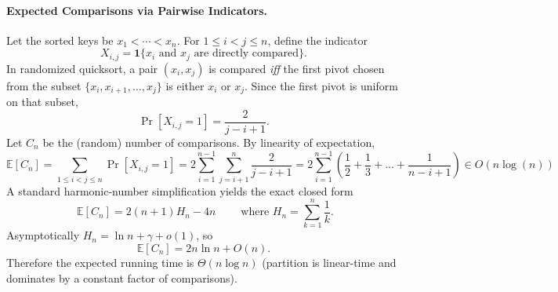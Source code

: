 \documentclass[9pt]{extarticle}
\begin{document}
\paragraph{Expected Comparisons via Pairwise Indicators.}
Let the sorted keys be $x_1<\cdots<x_n$. For $1\le i<j\le n$, define the indicator
\[
X_{i,j}=\mathbf{1}\{\text{$x_i$ and $x_j$ are directly compared}\}.
\]
In randomized quicksort, a pair $(x_i,x_j)$ is compared \emph{iff} the first pivot chosen from the subset $\{x_i,x_{i+1},\dots,x_j\}$ is either $x_i$ or $x_j$. Since the first pivot is uniform on that subset,
\[
\Pr[X_{i,j}=1]=\frac{2}{j-i+1}.
\]
Let $C_n$ be the (random) number of comparisons. By linearity of expectation,
\[
\mathbb{E}[C_n]=\sum_{1\le i<j\le n}\Pr[X_{i,j}=1]
=2\sum_{i=1}^{n-1}\sum_{j=i+1}^{n}\frac{2}{j-i+1}
=2\sum_{i=1}^{n-1}(\frac{1}{2} + \frac{1}{3} + \dots + \frac{1}{n - i + 1}) \in O(n\log(n))
\]
A standard harmonic-number simplification yields the exact closed form
\[
\boxed{\;\mathbb{E}[C_n]=2(n+1)H_n-4n\;}\qquad
\text{where }H_n=\sum_{k=1}^n\frac{1}{k}.
\]
Asymptotically $H_n=\ln n+\gamma+o(1)$, so
\[
\mathbb{E}[C_n]=2n\ln n+O(n).
\]
Therefore the expected running time is $\Theta(n\log n)$ (partition is linear-time and dominates by a constant factor of comparisons).
\end{document}
